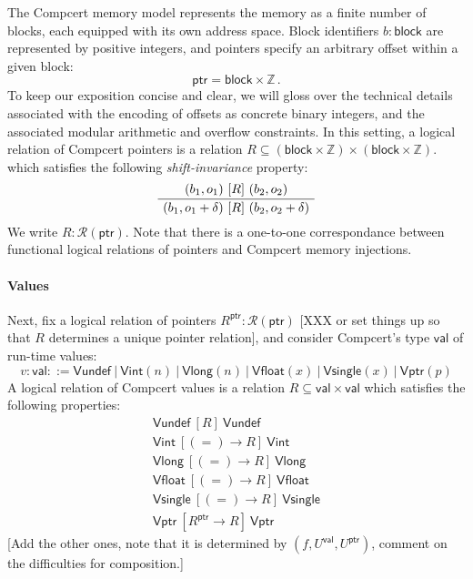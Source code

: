 \documentclass[acmsmall,anonymous]{acmart}
\newcommand{\kw}[1]{\ensuremath{ \textsf{#1} }}
\newcommand{\ifr}[1]{\ [{#1}]\ }
\newcommand{\alt}{\ |\ }
\begin{document}
The Compcert memory model \cite{compcertmmv2}
represents the memory as a finite number of blocks,
each equipped with its own address space.
Block identifiers $b : \kw{block}$
are represented by positive integers,
and pointers specify an arbitrary offset within a given block:
\[
    \kw{ptr} = \kw{block} \times \mathbb{Z} \,.
\]
To keep our exposition concise and clear,
we will gloss over the technical details
associated with the encoding of offsets
as concrete binary integers,
and the associated modular arithmetic and overflow constraints.
In this setting,
a logical relation of Compcert pointers
is a relation $R \subseteq (\kw{block} \times \mathbb{Z}) \times (\kw{block} \times \mathbb{Z})$.
which satisfies the following \emph{shift-invariance} property:
\[
  \AxiomC{$(b_1, o_1) \ifr{R} (b_2, o_2)$}
  \UnaryInfC{$(b_1, o_1 + \delta) \ifr{R} (b_2, o_2 + \delta)$}
  \DisplayProof
\]
We write $R : \mathcal{R}(\kw{ptr})$.
Note that there is a one-to-one correspondance between
functional logical relations of pointers and
Compcert memory injections.

\paragraph{Values}

Next,
fix a logical relation of pointers $R^\kw{ptr} : \mathcal{R}(\kw{ptr})$
[XXX or set things up so that $R$ determines a unique pointer relation],
and consider Compcert's type \kw{val} of run-time values:
\[
  v : \kw{val} ::= \kw{Vundef}
          \alt \kw{Vint}(n)
          \alt \kw{Vlong}(n)
          \alt \kw{Vfloat}(x)
          \alt \kw{Vsingle}(x)
          \alt \kw{Vptr}(p)
\]
A logical relation of Compcert values
is a relation $R \subseteq \kw{val} \times \kw{val}$
which satisfies the following properties:
\begin{gather*}
  \kw{Vundef} \ifr{R} \kw{Vundef} \\
  \kw{Vint} \ifr{(=) \rightarrow R} \kw{Vint} \\
  \kw{Vlong} \ifr{(=) \rightarrow R} \kw{Vlong} \\
  \kw{Vfloat} \ifr{(=) \rightarrow R} \kw{Vfloat} \\
  \kw{Vsingle} \ifr{(=) \rightarrow R} \kw{Vsingle} \\
  \kw{Vptr} \ifr{R^\kw{ptr} \rightarrow R} \kw{Vptr}
\end{gather*}
[Add the other ones, note that it is determined by $(f, U^\kw{val}, U^\kw{ptr})$,
comment on the difficulties for composition.]
\end{document}
